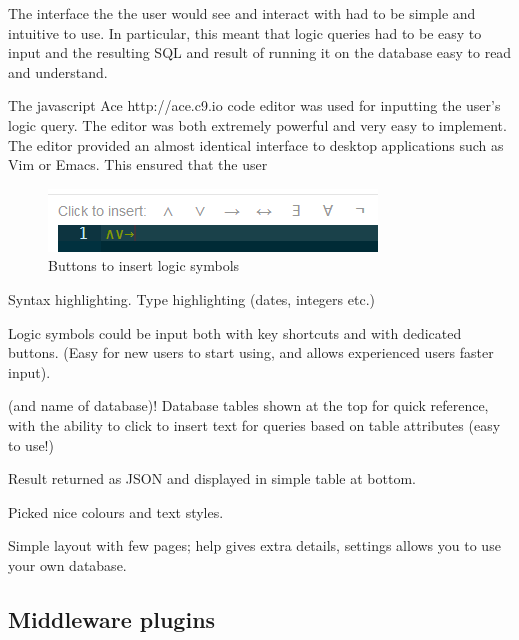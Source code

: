 \documentclass[a4paper, 11pt]{article}
\begin{document}
      The interface the the user would see and interact with had to be simple
      and intuitive to use. In particular, this meant that logic queries had to
      be easy to input and the resulting SQL and result of running it on the
      database easy to read and understand.

      The javascript Ace http://ace.c9.io code editor was used for inputting the
      user's
      logic query. The editor was both extremely powerful and very easy to
      implement. The editor provided an almost identical interface to desktop
      applications such as Vim or Emacs. This ensured that the user 

      \begin{figure}[h!]
        \centering
        \includegraphics[]{images/LogicSymbols.png}
        \caption{Buttons to insert logic symbols}
      \end{figure}

      Syntax highlighting. Type highlighting (dates, integers etc.)

      Logic symbols could be input both with key shortcuts and with dedicated
      buttons. (Easy for new users to start using, and allows experienced users
      faster input).

      (and name of database)!
      Database tables shown at the top for quick reference, with the ability to
      click to insert text for queries based on table attributes (easy to use!)

      Result returned as JSON and displayed in simple table at bottom.

      Picked nice colours and text styles.

      Simple layout with few pages; help gives extra details, settings allows
      you to use your own database.
 

  \subsection{Middleware plugins}
\end{document}
